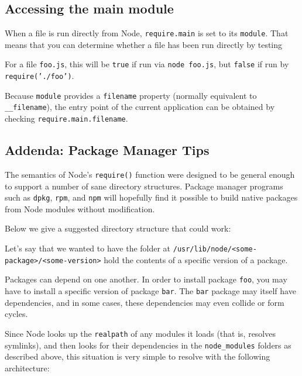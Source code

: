 \subsection{Accessing the main module}\label{accessing-the-main-module}

When a file is run directly from Node, \texttt{require.main} is set to
its \texttt{module}. That means that you can determine whether a file
has been run directly by testing

\begin{Shaded}
\begin{Highlighting}[]
 
\end{Highlighting}
\end{Shaded}

For a file \texttt{foo.js}, this will be \texttt{true} if run via
\texttt{node foo.js}, but \texttt{false} if run by
\texttt{require('./foo')}.

Because \texttt{module} provides a \texttt{filename} property (normally
equivalent to \texttt{\_\_filename}), the entry point of the current
application can be obtained by checking \texttt{require.main.filename}.

\subsection{Addenda: Package Manager
Tips}\label{addenda-package-manager-tips}

The semantics of Node's \texttt{require()} function were designed to be
general enough to support a number of sane directory structures. Package
manager programs such as \texttt{dpkg}, \texttt{rpm}, and \texttt{npm}
will hopefully find it possible to build native packages from Node
modules without modification.

Below we give a suggested directory structure that could work:

Let's say that we wanted to have the folder at
\texttt{/usr/lib/node/\textless{}some-package\textgreater{}/\textless{}some-version\textgreater{}}
hold the contents of a specific version of a package.

Packages can depend on one another. In order to install package
\texttt{foo}, you may have to install a specific version of package
\texttt{bar}. The \texttt{bar} package may itself have dependencies, and
in some cases, these dependencies may even collide or form cycles.

Since Node looks up the \texttt{realpath} of any modules it loads (that
is, resolves symlinks), and then looks for their dependencies in the
\texttt{node\_modules} folders as described above, this situation is
very simple to resolve with the following architecture:

